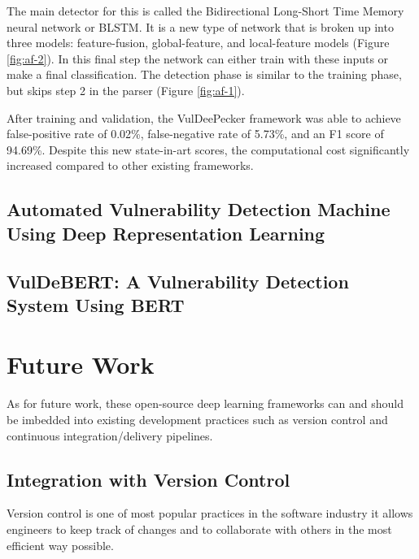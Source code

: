 \documentclass[12pt,twocolumn,letterpaper]{article}
\begin{document}
The main detector for this is called the Bidirectional Long-Short Time Memory neural network or BLSTM. It 
is a new type of network that is broken up into three models: feature-fusion, global-feature, and local-feature 
models (Figure \ref{fig:af-2}). In this final step the network can either train with these inputs or make 
a final classification. The detection phase is similar to the training phase, but skips step 2 in the parser 
(Figure \ref{fig:af-1}). 

After training and validation, the VulDeePecker framework was able to achieve false-positive rate of 
0.02\%, false-negative rate of 5.73\%, and an F1 score of 94.69\%. Despite this new state-in-art scores, 
the computational cost significantly increased compared to other existing frameworks.

\subsection{Automated Vulnerability Detection Machine Using Deep Representation Learning}
\label{sub:automated-vulnerability-detection-machine-using-deep-representation-learning}

\cite{Russell18}

\subsection{VulDeBERT: A Vulnerability Detection System Using BERT}
\label{sub:vuldebert}

\cite{Kim22}

\section{Future Work}
\label{sec:future-work}

As for future work, these open-source deep learning frameworks can and should be imbedded into existing 
development practices such as version control and continuous integration/delivery pipelines.

\subsection{Integration with Version Control}
\label{sub:integrating-with-version-control}

Version control is one of most popular practices in the software industry it allows engineers to keep track 
of changes and to collaborate with others in the most efficient way possible. 
\end{document}

